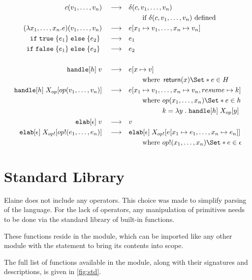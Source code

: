 \newcommand{\reduce}{\quad\longrightarrow\quad}
\begin{align*}
    c(v_1, \dots, v_n) \reduce& \delta(c, v_1, \dots, v_n) \\
    &\qquad\text{if } \delta(c, v_1, \dots, v_n) \text{ defined}\\
    (\lambda x_1, \dots, x_n . e) (v_1, \dots, v_n) \reduce& e[x_1 \mapsto v_1, \dots, x_n \mapsto v_n] \\
    \cond{\true}{e_1}{e_2} \reduce& e_1 \\
    \cond{\false}{e_1}{e_2} \reduce& e_2 \\
    \\
    \kw{handle}[h]\;v \reduce& e[x\mapsto v] \\
    &\qquad\text{where } \return(x) \S{ e } \in H\\
    \kw{handle}[h]\;X_{op}[op(v_1, \dots, v_n)] \reduce& e[x_1\mapsto v_1, \dots, x_n\mapsto v_n, resume \mapsto k] \\
    &\qquad \text{where } \begin{aligned}[t]
        & op(x_1, \dots, x_n) \S{e} \in h\\
        & k = \lam{y}{\kw{handle}[h]\;
        X_{op}[y]}
    \end{aligned}\\
    \kw{elab}[\epsilon]\;v \reduce& v\\
    \kw{elab}[\epsilon]\;X_{op!}[op!(e_1, \dots, e_n)] \reduce& \kw{elab}[\epsilon]\;X_{op!}[e[x_1 \mapsto e_1, \dots, x_n \mapsto e_n]] \\
    &\qquad \text{where } op!(x_1, \dots, x_n) \S{e} \in \epsilon \\
\end{align*}

\section{Standard Library}\label{sec:std}

Elaine does not include any operators. This choice was made to simplify parsing of the language. For the lack of operators, any manipulation of primitives needs to be done via the standard library of built-in functions.

These functions reside in the  module, which can be imported like any other module with the  statement to bring its contents into scope.

The full list of functions available in the  module, along with their signatures and descriptions, is given in \cref{fig:std}.

